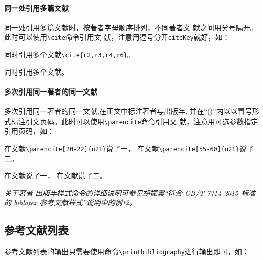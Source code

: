 \documentclass{ctexart}
\newcommand\cs[1]{\texttt{\textbackslash#1}}
\newcommand{\note}[1]{{%
  \color{magenta}{\noindent\bfseries 注意：}\emph{#1}}}
\begin{document}
\paragraph{同一处引用多篇文献}

同一处引用多篇文献时，按著者字母顺序排列，不同著者文
献之间用分号隔开。此时可以使用\cs{cite}命令引用文
献，注意用逗号分开\texttt{citeKey}就好，如：

\begin{center}
  \begin{minipage}{0.45\textwidth}
    \small
    同时引用多个文献\verb|\cite{r2,r3,r4,r6}|。%
  \end{minipage}
  \begin{boxedminipage}{0.45\textwidth}
    \small
    同时引用多个文献\cite{r2,r3,r4,r6}。%
  \end{boxedminipage}
\end{center}

\paragraph{多次引用同一著者的同一文献}

多次引用同一著者的同一文献,在正文中标注著者与出版年,
并在\enquote{()}内以以冒号形式标注引文页码。此时可以使用\cs{parencite}命令引用文
献，注意用可选参数指定引用页码，如：

\begin{center}
  \begin{minipage}{0.45\textwidth}
    \small
    在文献\verb|\parencite[20-22]{n21}|说了一， 在文献\verb|\parencite[55-60]{n21}|说了二。%
  \end{minipage}
  \begin{boxedminipage}{0.45\textwidth}
    \small
    在文献\parencite[20-22]{n21}说了一， 在文献\parencite[55-60]{n21}说了二。%
  \end{boxedminipage}
\end{center}

\note{关于著者-出版年样式命令的详细说明可参见胡振震\enquote{符合 GB/T
  7714-2015 标准的 biblatex 参考文献样式}说明中的例12。}

\subsection{参考文献列表}

参考文献列表的输出只需要使用命令\cs{printbibliography}进行输出即可，如：

\nocite{达尔文1896,广西壮族自治区林业厅1993--,r4,张若凌2004--,Miroslav2004--,于潇2012-1518-1523,马克思2013-302-302,张田勤2000--,萧钰2001--,刘加林1993--}
\printbibliography%
\end{document}
